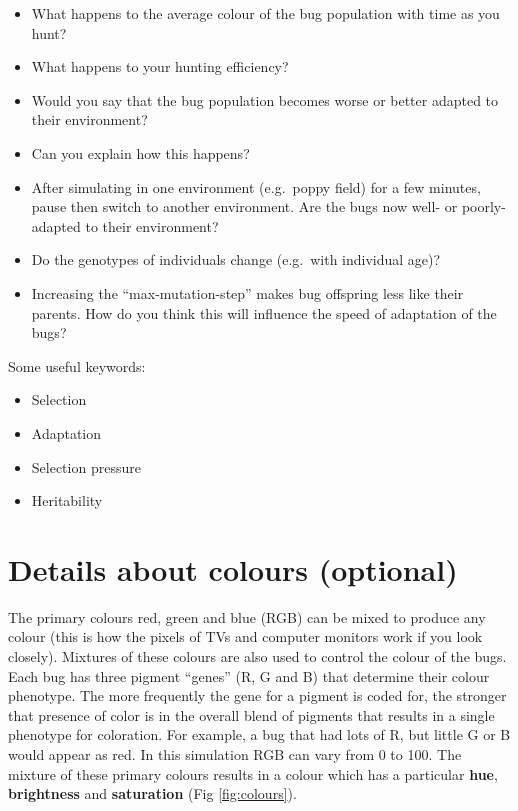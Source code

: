 \documentclass[
  a4paper]{book}
\providecommand{\tightlist}{%
  \setlength{\itemsep}{0pt}\setlength{\parskip}{0pt}}
\begin{document}
\begin{itemize}
\tightlist
\item
  What happens to the average colour of the bug population with time as you hunt?
\item
  What happens to your hunting efficiency?
\item
  Would you say that the bug population becomes worse or better adapted to their environment?
\item
  Can you explain how this happens?
\item
  After simulating in one environment (e.g.~poppy field) for a few minutes, pause then switch to another environment. Are the bugs now well- or poorly-adapted to their environment?
\item
  Do the genotypes of individuals change (e.g.~with individual age)?
\item
  Increasing the ``max-mutation-step'' makes bug offspring less like their parents. How do you think this will influence the speed of adaptation of the bugs?
\end{itemize}

Some useful keywords:

\begin{itemize}
\tightlist
\item
  Selection
\item
  Adaptation
\item
  Selection pressure
\item
  Heritability
\end{itemize}

\hypertarget{details-about-colours-optional}{%
\section{Details about colours (optional)}\label{details-about-colours-optional}}

The primary colours red, green and blue (RGB) can be mixed to produce any colour (this is how the pixels of TVs and computer monitors work if you look closely). Mixtures of these colours are also used to control the colour of the bugs. Each bug has three pigment ``genes'' (R, G and B) that determine their colour phenotype. The more frequently the gene for a pigment is coded for, the stronger that presence of color is in the overall blend of pigments that results in a single phenotype for coloration. For example, a bug that had lots of R, but little G or B would appear as red. In this simulation RGB can vary from 0 to 100. The mixture of these primary colours results in a colour which has a particular \textbf{hue}, \textbf{brightness} and \textbf{saturation} (Fig \ref{fig:colours}).
\end{document}
